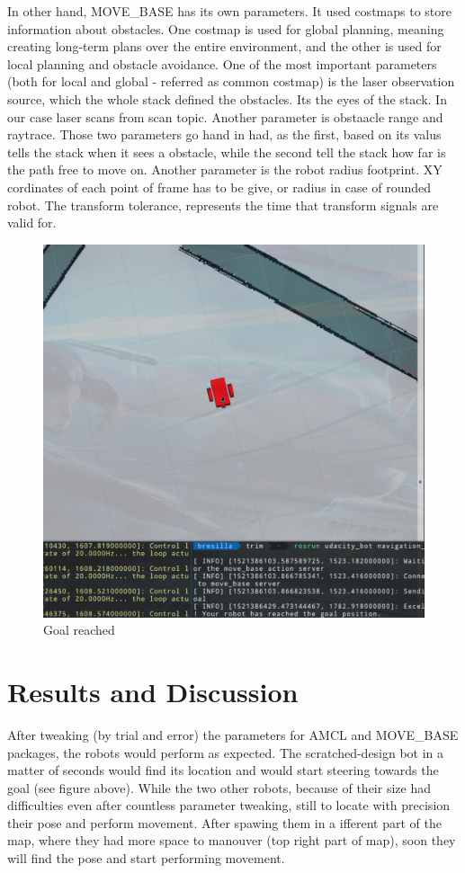 \documentclass[10pt,journal,compsoc]{IEEEtran}
\begin{document}
    In other hand, MOVE\_BASE has its own parameters. It used costmaps to store information about obstacles. One costmap is used for global planning, meaning creating long-term plans over the entire environment, and the other is used for local planning and obstacle avoidance. One of the most important parameters (both for local and global - referred as common costmap) is the laser observation source, which the whole stack defined the obstacles. Its the eyes of the stack. In our case laser scans from scan topic. Another parameter is obstaacle range and raytrace. Those two parameters go hand in had, as the first, based on its valus tells the stack when it sees a obstacle, while the second tell the stack how far is the path free to move on. Another parameter is the robot radius footprint. XY cordinates of each point of frame has to be give, or radius in case of rounded robot. The transform tolerance, represents the time that transform signals are valid for.

    \begin{figure}[thptb]
        \centering
        \includegraphics[width=\linewidth]{goal_reched.png}
        \caption{Goal reached}
        \label{fig:robot3}
    \end{figure}
   
     
    \section{Results and Discussion}
    After tweaking (by trial and error) the parameters for AMCL and MOVE\_BASE packages, the robots would perform as expected. The scratched-design bot in a matter of seconds would find its location and would start steering towards the goal (see figure above). While the two other robots, because of their size had difficulties even after countless parameter tweaking, still to locate with precision their pose and perform movement. After spawing them in a ifferent part of the map, where they had more space to manouver (top right part of map), soon they will find the pose and start performing movement. 
\end{document}
